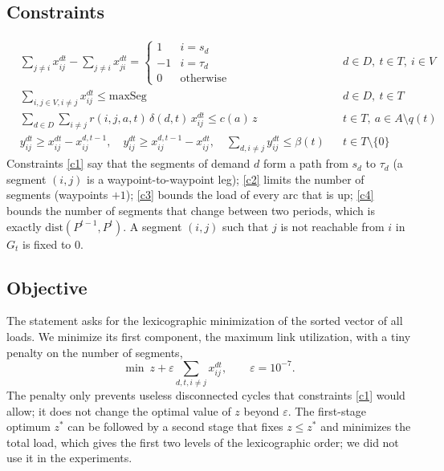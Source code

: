\subsection{Constraints}
\begin{align}
&\sum_{j\ne i} x^{dt}_{ij}-\sum_{j\ne i} x^{dt}_{ji}=\begin{cases}1 & i=s_d\\ -1 & i=\tau_d\\ 0&\text{otherwise}\end{cases} && d\in D,\ t\in T,\ i\in V \label{c1}\\
&\sum_{i,j\in V, i\neq j} x^{dt}_{ij}\le \mathrm{maxSeg} && d\in D,\ t\in T \label{c2}\\
&\sum_{d\in D}\sum_{i\ne j} r(i,j,a,t)\,\delta(d,t)\,x^{dt}_{ij}\le c(a)\,z && t\in T,\ a\in A\setminus q(t) \label{c3}\\
&y^{dt}_{ij}\ge x^{dt}_{ij}-x^{d,t-1}_{ij},\quad y^{dt}_{ij}\ge x^{d,t-1}_{ij}-x^{dt}_{ij},\quad \sum_{d,i\ne j} y^{dt}_{ij}\le \beta(t) && t\in T\setminus\{0\} \label{c4}
\end{align}
Constraints \eqref{c1} say that the segments of demand $d$ form a path from $s_d$ to $\tau_d$ (a segment $(i,j)$ is a waypoint-to-waypoint leg); \eqref{c2} limits the number of segments (waypoints $+1$); \eqref{c3} bounds the load of every arc that is up; \eqref{c4} bounds the number of segments that change between two periods, which is exactly $\mathrm{dist}(P^{t-1},P^t)$. A segment $(i,j)$ such that $j$ is not reachable from $i$ in $G_t$ is fixed to $0$.

\subsection{Objective}
The statement asks for the lexicographic minimization of the sorted vector of all loads. We minimize its first component, the maximum link utilization, with a tiny penalty on the number of segments,
\begin{equation}
\min\ z+\varepsilon\sum_{d,t,i\ne j}x^{dt}_{ij},\qquad \varepsilon=10^{-7}. \label{obj}
\end{equation}
The penalty only prevents useless disconnected cycles that constraints \eqref{c1} would allow; it does not change the optimal value of $z$ beyond $\varepsilon$. The first-stage optimum $z^*$ can be followed by a second stage that fixes $z\le z^*$ and minimizes the total load, which gives the first two levels of the lexicographic order; we did not use it in the experiments.
